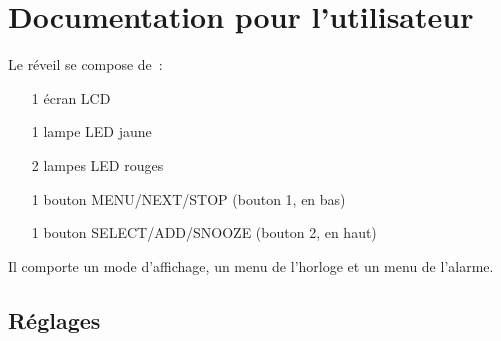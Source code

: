 \documentclass[12pt,a4paper]{article}
\begin{document}
\section{Documentation pour l'utilisateur}

Le réveil se compose de~:
\begin{itemize}
\item[1] écran LCD
\item[1] lampe LED jaune
\item[2] lampes LED rouges
\item[1] bouton MENU/NEXT/STOP (bouton 1, en bas)
\item[1] bouton SELECT/ADD/SNOOZE (bouton 2, en haut)
\end{itemize}

Il comporte un mode d'affichage, un menu de l'horloge et un menu de l'alarme.

\subsection{Réglages}
\end{document}
